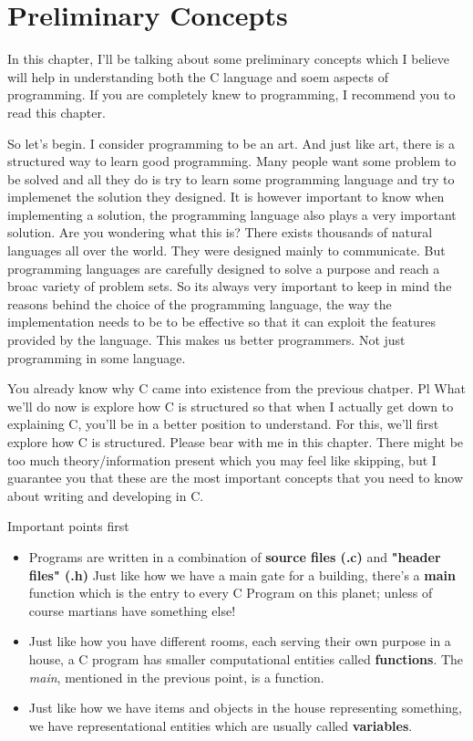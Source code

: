 \chapter{Preliminary Concepts}


In this chapter, I'll be talking about some preliminary concepts which I believe will help in understanding both the C language and soem aspects of programming. If you are completely knew to programming, I recommend you to read this chapter.

So let's begin. I consider programming to be an art. And just like art, there is a structured way to learn good programming. Many people want some problem to be solved and all they do is try to learn some programming language and try to implemenet the solution they designed. It is however important to know when implementing a solution, the programming language also plays a very important solution. Are you wondering what this is? There exists thousands of natural languages all over the world. They were designed mainly to communicate. But programming languages are carefully designed to solve a purpose and reach a broac variety of problem sets. So its always very important to keep in mind the reasons behind the choice of the programming language, the way the implementation needs to be to be effective so that it can exploit the features provided by the language. This makes us better programmers. Not just programming in some language. 

You already know why C came into existence from the previous chatper. Pl What we'll do now is explore how C is structured so that when I actually get down to explaining C, you'll be in a better position to understand. For this, we'll first explore how C is structured. Please bear with me in this chapter. There might be too much theory/information present which you may feel like skipping, but I guarantee you that these are the most important concepts that you need to know about writing and developing in C.

Important points first
\begin{itemize}
\item Programs are written in a combination of \textbf{source files (.c)} and \textbf{"header files" (.h)}
\itme Just like how we have a main gate for a building, there's a \textbf{main} function which is the entry to every C Program on this planet; unless of course martians have something else!
\item Just like how you have different rooms, each serving their own purpose in a house, a C program has smaller computational entities called \textbf{functions}. The \textit{main}, mentioned in the previous point, is a function.
\item Just like how we have items and objects in the house representing something, we have representational entities which are usually called \textbf{variables}. 
\end{itemize}

